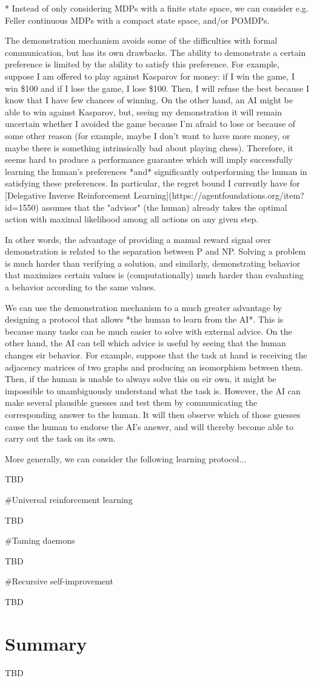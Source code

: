 \documentclass[a4paper]{article}
\begin{document}
* Instead of only considering MDPs with a finite state space, we can consider e.g. Feller continuous MDPs with a compact state space, and/or POMDPs.

The demonstration mechanism avoids some of the difficulties with formal communication, but has its own drawbacks. The ability to demonstrate a certain preference is limited by the ability to satisfy this preference. For example, suppose I am offered to play against Kasparov for money: if I win the game, I win \$100 and if I lose the game, I lose \$100. Then, I will refuse the best because I know that I have few chances of winning. On the other hand, an AI might be able to win against Kasparov, but, seeing my demonstration it will remain uncertain whether I avoided the game because I'm afraid to lose or because of some other reason (for example, maybe I don't want to have more money, or maybe there is something intrinsically bad about playing chess). Therefore, it seems hard to produce a performance guarantee which will imply successfully learning the human's preferences *and* significantly outperforming the human in satisfying these preferences. In particular, the regret bound I currently have for [Delegative Inverse Reinforcement Learning](https://agentfoundations.org/item?id=1550) assumes that the "advisor" (the human) already takes the optimal action with maximal likelihood among all actions on any given step.

In other words, the advantage of providing a manual reward signal over demonstration is related to the separation between P and NP. Solving a problem is much harder than verifying a solution, and similarly, demonstrating behavior that maximizes certain values is (computationally) much harder than evaluating a behavior according to the same values.

We can use the demonstration mechanism to a much greater advantage by designing a protocol that allows *the human to learn from the AI*. This is because many tasks can be much easier to solve with external advice. On the other hand, the AI can tell which advice is useful by seeing that the human changes eir behavior. For example, suppose that the task at hand is receiving the adjacency matrices of two graphs and producing an isomorphism between them. Then, if the human is unable to always solve this on eir own, it might be impossible to unambiguously understand what the task is. However, the AI can make several plausible guesses and test them by communicating the corresponding answer to the human. It will then observe which of those guesses cause the human to endorse the AI's answer, and will thereby become able to carry out the task on its own.

More generally, we can consider the following learning protocol...

TBD

\#Universal reinforcement learning

TBD

\#Taming daemons

TBD

\#Recursive self-improvement

TBD

\section{Summary}


TBD
\end{document}
